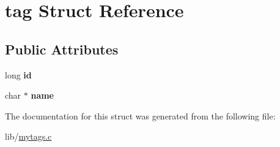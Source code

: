 \hypertarget{structtag}{}\section{tag Struct Reference}
\label{structtag}
\subsection*{Public Attributes}
\begin{DoxyCompactItemize}
\item 
long {\bfseries id}\hypertarget{structtag_a07bce79d95a3dc1c38170e2eb33e06df}{}\label{structtag_a07bce79d95a3dc1c38170e2eb33e06df}

\item 
char $\ast$ {\bfseries name}\hypertarget{structtag_a5ad767022d2fcc4799c861c03c5d6c63}{}\label{structtag_a5ad767022d2fcc4799c861c03c5d6c63}

\end{DoxyCompactItemize}


The documentation for this struct was generated from the following file\+:\begin{DoxyCompactItemize}
\item 
lib/\hyperlink{mytags_8c}{mytags.\+c}\end{DoxyCompactItemize}

